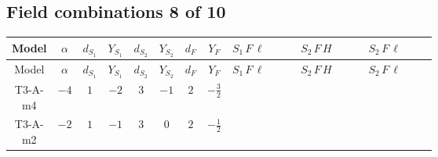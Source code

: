 \documentclass[8pt]{article}
\begin{document}
\begin{landscape}
\subsection*{Field combinations 8 of 10}
\begin{longtable}{@{}cccccccc >{\raggedright\arraybackslash}p{0.21\linewidth} >{\raggedright\arraybackslash}p{0.21\linewidth} >{\raggedright\arraybackslash}p{0.21\linewidth}@{}}
\toprule
Model & $\alpha$ & $d_{S_1}$ & $Y_{S_1}$ & $d_{S_2}$ & $Y_{S_2}$ & $d_F$ & $Y_F$ & $S_1\,F\,\ell$ & $S_2\,F\,H$ & $S_2\,F\,\ell$ \\
\midrule
\endfirsthead
\toprule
Model & $\alpha$ & $d_{S_1}$ & $Y_{S_1}$ & $d_{S_2}$ & $Y_{S_2}$ & $d_F$ & $Y_F$ & $S_1\,F\,\ell$ & $S_2\,F\,H$ & $S_2\,F\,\ell$ \\
\midrule
\endhead
T3-A-m4 & $-4$ & $1$ & $-2$ & $3$ & $-1$ & $2$ & $-\frac{3}{2}$ &  & \scriptsize\adjustbox{max width=\linewidth}{$\begin{gathered} -\frac{2 \hbar  \log \left(\frac{\bar{\mu}^{2}}{M_F^2}\right) \overline{y_{2,i_1,r_1}} \overline{Y_{e,i_2,i_3}} H_{a_1} S_{2,j_1} y_{2,i_2,r_1} Y_{e,i_1,i_3} H_{a_1}{}^{\dagger } S_{2,j_1}{}^{\dagger }}{\sqrt{3}} \\ -2 i \sqrt{\frac{2}{3}} \hbar  \log \left(\frac{\bar{\mu}^{2}}{M_F^2}\right) \overline{y_{2,i_1,r_1}} \overline{Y_{e,i_2,i_3}} H_{a_2} S_{2,j_2} y_{2,i_2,r_1} Y_{e,i_1,i_3} H_{a_1}{}^{\dagger } S_{2,j_1}{}^{\dagger } \mathcal{I}_{H2,a_1,a_2,j_1,j_2}{}^1 \\ -\frac{2 \hbar  \log \left(\frac{\bar{\mu}^{2}}{M_F^2}\right) \overline{y_{2,i_1,r_1}} H_{a_2} S_{2,j_2} y_{2,i_1,r_1} H_{a_1}{}^{\dagger } S_{2,j_1}{}^{\dagger } \mathcal{I}_{H2,a_1,a_2,j_1,j_2}{}^2 \lambda_{HS_2}^{(1)}^{(2)}}{\sqrt{3}}\end{gathered}$} &  \\
\midrule
T3-A-m2 & $-2$ & $1$ & $-1$ & $3$ & $0$ & $2$ & $-\frac{1}{2}$ &  & \scriptsize\adjustbox{max width=\linewidth}{$\begin{gathered} -\frac{2 \hbar  \log \left(\frac{\bar{\mu}^{2}}{M_F^2}\right) \overline{y_{2,i_1,r_1}} \overline{Y_{e,i_2,i_3}} H_{a_1} S_{2,j_1} y_{2,i_2,r_1} Y_{e,i_1,i_3} H_{a_1}{}^{\dagger } S_{2,j_1}{}^{\dagger }}{\sqrt{3}} \\ -2 i \sqrt{\frac{2}{3}} \hbar  \log \left(\frac{\bar{\mu}^{2}}{M_F^2}\right) \overline{y_{2,i_1,r_1}} \overline{Y_{e,i_2,i_3}} H_{a_2} S_{2,j_2} y_{2,i_2,r_1} Y_{e,i_1,i_3} H_{a_1}{}^{\dagger } S_{2,j_1}{}^{\dagger } \mathcal{I}_{H2,a_1,a_2,j_1,j_2}{}^1 \\ -\frac{2 \hbar  \log \left(\frac{\bar{\mu}^{2}}{M_F^2}\right) \overline{y_{2,i_1,r_1}} H_{a_2} S_{2,j_2} y_{2,i_1,r_1} H_{a_1}{}^{\dagger } S_{2,j_1}{}^{\dagger } \mathcal{I}_{H2,a_1,a_2,j_1,j_2}{}^2 \lambda_{HS_2}^{(1)}^{(2)}}{\sqrt{3}}\end{gathered}$} &  \\

\end{longtable}
\end{landscape}
\end{document}

